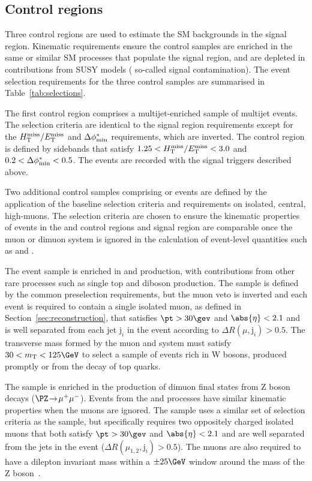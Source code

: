 \subsection{Control regions}
\label{sec:control}

Three control regions are used to estimate the SM backgrounds in the
signal region. Kinematic requirements ensure the control samples are
enriched in the same or similar SM processes that populate the signal
region, and are depleted in contributions from SUSY models (\ie
so-called signal contamination). The event selection requirements for
the three control samples are summarised in
Table~\ref{tab:selections}.

The first control region comprises a multijet-enriched sample of
multijet events. The selection criteria are identical to the signal
region requirements except for the $H_{\text{T}}^{\text{miss}} / E_{\text{T}}^{\text{miss}}$ and $\Delta\phi^{*}_\text{min}$
requirements, which are inverted. The control region is defined by
sidebands that satisfy $1.25 < H_{\text{T}}^{\text{miss}} / E_{\text{T}}^{\text{miss}} < 3.0$ and $0.2 < \Delta\phi^{*}_\text{min} <
0.5$. The events are recorded with the signal triggers described
above.

Two additional control samples comprising \mj or \mmj events are
defined by the application of the baseline selection criteria and
requirements on isolated, central, high-\pt muons. The selection
criteria are chosen to ensure the kinematic properties of events in
the \mj and \mmj control regions and signal region are comparable once
the muon or dimuon system is ignored in the calculation of event-level
quantities such as \scalht and \mht.

The \mj event sample is enriched in \wmj and \ttbar production, with
contributions from other rare processes such as single top and diboson
production. The sample is defined by the common preselection
requirements, but the muon veto is inverted and each event is required
to contain a single isolated muon, as defined in
Section~\ref{sec:reconstruction}, that satisfies $\pt > 30\gev$ and
$\abs{\eta} < 2.1$ and is well separated from each jet $\text{j}_i$
in the event according to $\Delta R(\mu,\text{j}_i) > 0.5$. The
transverse mass formed by the muon \pt and \ptvecmiss system must
satisfy $30 < m_\text{T} < 125\GeV$ to select a sample of events
rich in W bosons, produced promptly or from the decay of top quarks.

The \mmj sample is enriched in the production of dimuon final states
from Z boson decays ($\PZ\! \rightarrow\!  \mu^+\mu^-$). Events from
the \znunuj and \zmumuj processes have similar kinematic properties
when the muons are ignored. The sample uses a similar set of selection
criteria as the \mj sample, but specifically requires two oppositely
charged isolated muons that both satisfy $\pt > 30\gev$ and
$\abs{\eta} < 2.1$ and are well separated from the jets in the event
($\Delta R(\mu_{1,2},\text{j}_i) > 0.5$). The muons are also
required to have a dilepton invariant mass within a $\pm 25\GeV$
window around the mass of the Z boson~\cite{1674-1137-38-9-090001}.

